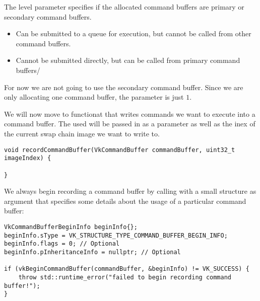 \par The level parameter specifies if the allocated command buffers are primary or secondary command buffers.

\begin{itemize}
    \item {} Can be submitted to a queue for execution, but cannot be called from other command buffers.
    \item {} Cannot be submitted directly, but can be called from primary command buffers/
\end{itemize}

\par For now we are not going to use the secondary command buffer. Since we are only allocating one command buffer, the  parameter is just $1$.

\par We will now move to  functionat that writes commands we want to execute into a command buffer. The  used will be passed in as a parameter as well as the inex of the current swap chain image we want to write to.

 \begin{center}
\begin{minipage}{0.95\linewidth}
\begin{lstlisting}
void recordCommandBuffer(VkCommandBuffer commandBuffer, uint32_t imageIndex) {

}
\end{lstlisting}
\end{minipage}
\end{center}

\par We always begin recording a command buffer by calling  with a small  structure as argument that specifies some details about the usage of  a particular command buffer:

\begin{center}
\begin{minipage}{0.95\linewidth}
\begin{lstlisting}
VkCommandBufferBeginInfo beginInfo{};
beginInfo.sType = VK_STRUCTURE_TYPE_COMMAND_BUFFER_BEGIN_INFO;
beginInfo.flags = 0; // Optional
beginInfo.pInheritanceInfo = nullptr; // Optional

if (vkBeginCommandBuffer(commandBuffer, &beginInfo) != VK_SUCCESS) {
    throw std::runtime_error("failed to begin recording command buffer!");
}
\end{lstlisting}
\end{minipage}
\end{center}


